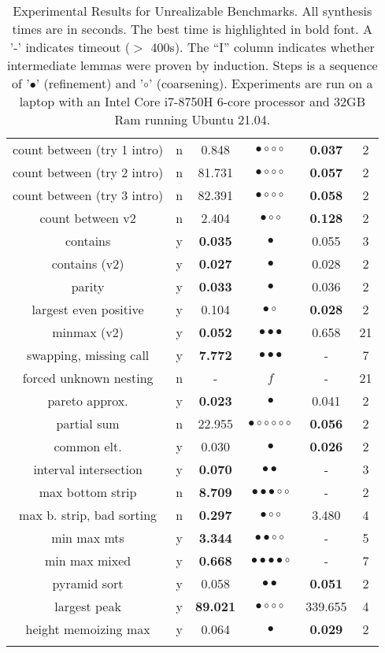 {\begin{longtable}[h]{|c|c|c|c||c|c|}
count between (try 1 intro) & n &  0.848 & $\bullet\circ\circ\circ$ & {\bf 0.037}  & 2 \\ 
count between (try 2 intro) & n &  81.731 & $\bullet\circ\circ\circ$ & {\bf 0.057}  & 2 \\ 
count between (try 3 intro) & n &  82.391 & $\bullet\circ\circ\circ$ & {\bf 0.058}  & 2 \\ 
count between v2 & n &  2.404 & $\bullet\circ\circ$ & {\bf 0.128}  & 2 \\ 
contains & y & {\bf 0.035} & $\bullet$ &  0.055  & 3 \\ 
contains (v2) & y & {\bf 0.027} & $\bullet$ &  0.028  & 2 \\ 
parity & y & {\bf 0.033} & $\bullet$ &  0.036  & 2 \\ 
largest even positive & y &  0.104 & $\bullet\circ$ & {\bf 0.028}  & 2 \\ 
minmax (v2) & y & {\bf 0.052} & $\bullet\bullet\bullet$ &  0.658  & 21 \\ 
swapping, missing call & y & {\bf 7.772} & $\bullet\bullet\bullet$ & -  & 7 \\ 
forced unknown nesting & n & - & $f$ & -  & 21 \\ 
pareto approx. & y & {\bf 0.023} & $\bullet$ &  0.041  & 2 \\ 
partial sum & n &  22.955 & $\bullet\circ\circ\circ\circ\circ$ & {\bf 0.056}  & 2 \\ 
common elt. & y &  0.030 & $\bullet$ & {\bf 0.026}  & 2 \\ 
interval intersection & y & {\bf 0.070} & $\bullet\bullet$ & -  & 3 \\ 
max bottom strip & n & {\bf 8.709} & $\bullet\bullet\bullet\circ\circ$ & -  & 2 \\ 
max b. strip, bad sorting & n & {\bf 0.297} & $\bullet\circ\circ$ &  3.480  & 4 \\ 
min max mts & y & {\bf 3.344} & $\bullet\bullet\circ\circ$ & -  & 5 \\ 
min max mixed & y & {\bf 0.668} & $\bullet\bullet\bullet\bullet\circ$ & -  & 7 \\ 
pyramid sort & y &  0.058 & $\bullet\bullet$ & {\bf 0.051}  & 2 \\ 
largest peak & y & {\bf 89.021} & $\bullet\circ\circ\circ$ &  339.655  & 4 \\ 
height memoizing max & y &  0.064 & $\bullet$ & {\bf 0.029}  & 2 \\ 
			\hline
	\caption{Experimental Results for Unrealizable Benchmarks. All synthesis times are in seconds. The best time is highlighted in bold font.  A '-' indicates timeout ($>$ 400s). The ``I'' column indicates whether intermediate lemmas were proven by induction. Steps is a sequence of '$\bullet$' (refinement) and '$\circ$' (coarsening). Experiments are run on a laptop with an Intel Core i7-8750H 6-core processor and 32GB Ram running Ubuntu 21.04.}\label{table:unrealizable-experiments}
		\end{longtable}
	}
